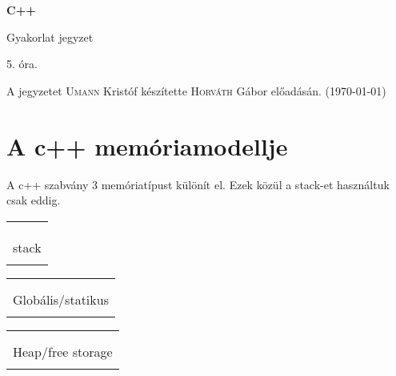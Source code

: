 \documentclass[a4paper,11.5pt]{article}
\begin{document}
	\setlength\parindent{0pt}
	\def\s{\hspace{0.2mm}\vphantom{\beta}}
	\def\Z{\mathbb{Z}}
	\def\Q{\mathbb{Q}}
	\def\R{\mathbb{R}}
	\def\C{\mathbb{C}}
	\def\N{\mathbb{N}}
	\def\Ra{\overline{\mathbb{R}}}
	
	\def\sume{\displaystyle\sum_{n=1}^{+\infty}}
	\def\sumn{\displaystyle\sum_{n=0}^{+\infty}}
	
	\def\narrow{\underset{n\rightarrow+\infty}{\longrightarrow}}
	\def\limn{\displaystyle\lim_{n\to +\infty}}
	\def\limx{\displaystyle\lim_{x\to +\infty}}
	
	\theoremstyle{definition}
	\newtheorem{theorem}{Tétel}[subsection] 
	
	\theoremstyle{definition}
	\newtheorem{definition}[theorem]{Definíció} 
	\newtheorem{example}[theorem]{Példa} 
	\newtheorem{task}[theorem]{Feladat} 
	\newtheorem{note}[theorem]{Megjegyzés}
	\begin{center}
		{\LARGE\textbf{C++}}
		
		{\Large Gyakorlat jegyzet}
		
		5. óra.
	\end{center}
	A jegyzetet \textsc{Umann} Kristóf készítette \textsc{Horváth} Gábor  előadásán. (\today)
	\section{A c++ memóriamodellje}
	A c++ szabvány 3 memóriatípust különít el. Ezek közül a stack-et használtuk csak eddig.
	\begin{center}
		\begin{tabular}{|c|}
			\\
			\\
			\\
			\\
			stack\\
			\\
			\hline
		\end{tabular}\quad 
		\begin{tabular}{|c|}
			\hline
			\quad \quad \\
			\\
			Globális/statikus\\
			\\
			\hline
		\end{tabular}\quad 
		\begin{tabular}{|c|}
			\hline
			\quad \quad \\
			\\
			Heap/free storage\\
			\\
			\hline
		\end{tabular}
	\end{center}
\end{document}
